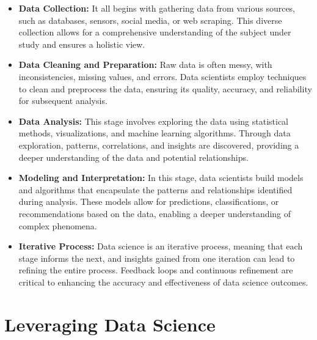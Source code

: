 \documentclass{vgtc}                          %
\begin{document}
\begin{itemize}
    \item \textbf{Data Collection:} It all begins with gathering data from various sources, such as databases, sensors, social media, or web scraping. This diverse collection 
    allows for a comprehensive understanding of the subject under study and ensures a holistic view.
    \item \textbf{Data Cleaning and Preparation:} Raw data is often messy, with inconsistencies, missing values, and errors. Data scientists employ techniques to clean 
    and preprocess the data, ensuring its quality, accuracy, and reliability for subsequent analysis.
    \item \textbf{Data Analysis:} This stage involves exploring the data using statistical methods, visualizations, and machine learning algorithms. Through data exploration, 
    patterns, correlations, and insights are discovered, providing a deeper understanding of the data and potential relationships.
    \item \textbf{Modeling and Interpretation:} In this stage, data scientists build models and algorithms that encapsulate the patterns and relationships identified during 
    analysis. These models allow for predictions, classifications, or recommendations based on the data, enabling a deeper understanding of complex phenomena.
    \item \textbf{Iterative Process:} Data science is an iterative process, meaning that each stage informs the next, and insights gained from one iteration can lead to refining 
    the entire process. Feedback loops and continuous refinement are critical to enhancing the accuracy and effectiveness of data science outcomes.
\end{itemize} 

\section{Leveraging Data Science}
\end{document}
